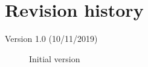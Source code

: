 \section{Revision history}
\begin{description}
    \item[Version 1.0 (10/11/2019)] Initial version 
\end{description}
